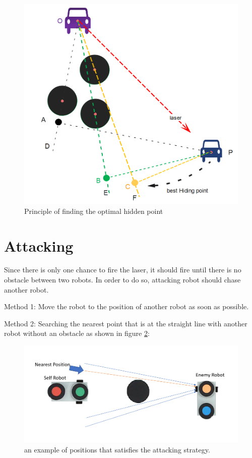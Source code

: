 \begin{figure}[thb]
    \centering
    \includegraphics[width=1\textwidth]{images/PathPlaningHidingModel.png}
    \caption[hiding strategy]{Principle of finding the optimal hidden point}\label{HidingModel}
\end{figure}



\section{Attacking}
Since there is only one chance to fire the laser, it should fire until there is no obstacle between two robots. In order to do so, attacking robot should chase another robot. 

Method 1:
Move the robot to the position of another robot as soon as possible.

Method 2:
Searching the nearest point that is at the straight line with another robot without an obstacle as shown in figure \ref{attacking_method2}:

\begin{figure}[thb]
    \centering
    \includegraphics[width=1\textwidth]{images/attacking_method2.png}
    \caption[attacking method]{an example of positions that satisfies the attacking strategy.}\label{attacking_method2}
\end{figure}
